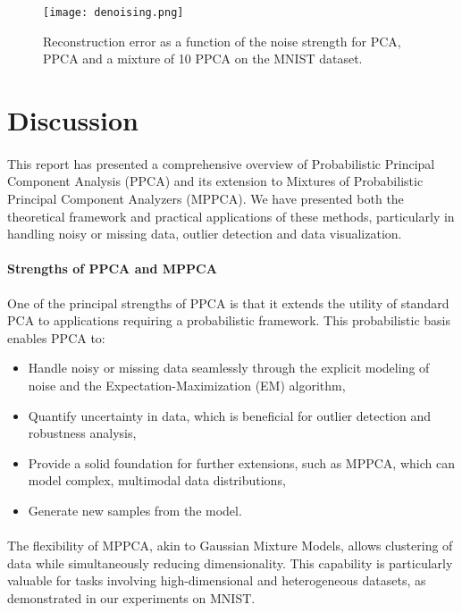 \documentclass{article}
\begin{document}
\begin{figure}[H]
    \centering
    \texttt{[image: denoising.png]}
    \caption{Reconstruction error as a function of the noise strength for PCA, PPCA and a mixture of 10 PPCA on the MNIST dataset.}
    \label{fig:denoising}
\end{figure}

\section{Discussion}
\label{sec:discussion}

\paragraph{} This report has presented a comprehensive overview of Probabilistic Principal Component Analysis (PPCA) and its extension to Mixtures of Probabilistic Principal Component Analyzers (MPPCA). We have presented both the theoretical framework and practical applications of these methods, particularly in handling noisy or missing data, outlier detection and data visualization.

\paragraph{Strengths of PPCA and MPPCA} One of the principal strengths of PPCA is that it extends the utility of standard PCA to applications requiring a probabilistic framework. This probabilistic basis enables PPCA to:
\begin{itemize}
    \item Handle noisy or missing data seamlessly through the explicit modeling of noise and the Expectation-Maximization (EM) algorithm,
    \item Quantify uncertainty in data, which is beneficial for outlier detection and robustness analysis,
    \item Provide a solid foundation for further extensions, such as MPPCA, which can model complex, multimodal data distributions,
    \item Generate new samples from the model.
\end{itemize}

\paragraph{} The flexibility of MPPCA, akin to Gaussian Mixture Models, allows clustering of data while simultaneously reducing dimensionality. This capability is particularly valuable for tasks involving high-dimensional and heterogeneous datasets, as demonstrated in our experiments on MNIST.
\end{document}
